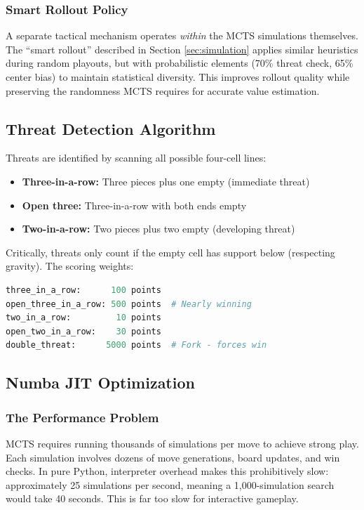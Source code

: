 \documentclass[11pt]{article}
\begin{document}
\subsubsection{Smart Rollout Policy}

A separate tactical mechanism operates \textit{within} the MCTS simulations themselves. The ``smart rollout'' described in Section \ref{sec:simulation} applies similar heuristics during random playouts, but with probabilistic elements (70\% threat check, 65\% center bias) to maintain statistical diversity. This improves rollout quality while preserving the randomness MCTS requires for accurate value estimation.

\subsection{Threat Detection Algorithm}

Threats are identified by scanning all possible four-cell lines:

\begin{itemize}
    \item \textbf{Three-in-a-row:} Three pieces plus one empty (immediate threat)
    \item \textbf{Open three:} Three-in-a-row with both ends empty
    \item \textbf{Two-in-a-row:} Two pieces plus two empty (developing threat)
\end{itemize}

Critically, threats only count if the empty cell has support below (respecting gravity). The scoring weights:

\begin{lstlisting}[language=Python, caption=Threat Scoring Weights]
three_in_a_row:      100 points
open_three_in_a_row: 500 points  # Nearly winning
two_in_a_row:         10 points
open_two_in_a_row:    30 points
double_threat:      5000 points  # Fork - forces win
\end{lstlisting}

\subsection{Numba JIT Optimization}

\subsubsection{The Performance Problem}

MCTS requires running thousands of simulations per move to achieve strong play. Each simulation involves dozens of move generations, board updates, and win checks. In pure Python, interpreter overhead makes this prohibitively slow: approximately 25 simulations per second, meaning a 1,000-simulation search would take 40 seconds. This is far too slow for interactive gameplay.
\end{document}
